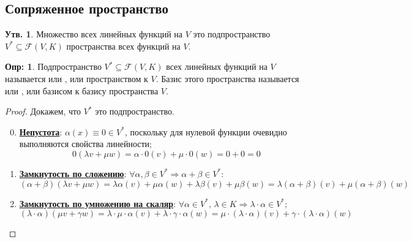 \documentclass[12pt]{article}
\newcommand{\MF}{\mathcal{F}}
\theoremstyle{definition}
\newtheorem{defn}{Опр:}
\newtheorem{prop}{Утв.}
\begin{document}
\subsection*{Сопряженное пространство}
\begin{prop}
	Множество всех линейных функций на $V$ это подпространство $V^* \subseteq \MF(V,K)$ пространства всех функций на $V$. 
\end{prop}
\begin{defn}
	Подпространство $V^* \subseteq \MF(V,K)$ всех линейных функций на $V$ называется  или , или  пространством к $V$. Базис этого пространства называется  или , или  базисом к базису пространства $V$.
\end{defn}
\begin{proof}
	Докажем, что $V^*$ это подпространство.
	\begin{enumerate}[label=\arabic*)]
		\setcounter{enumi}{-1}
		\item \textbf{\uline{Непустота}}: $\alpha(x) \equiv 0 \in V^{*}$, поскольку для нулевой функции очевидно выполняются свойства линейности;
		$$
			0(\lambda v + \mu w) = \alpha{\cdot}0(v) + \mu{\cdot}0(w) = 0 + 0 = 0
		$$
		\item \textbf{\uline{Замкнутость по сложению}}: $\forall \alpha, \beta \in V^* \Rightarrow \alpha + \beta \in V^*$:
		$$
			(\alpha + \beta)(\lambda v + \mu w) = \lambda \alpha(v) + \mu\alpha(w) + \lambda \beta(v) + \mu\beta(w) = \lambda(\alpha + \beta)(v) + \mu(\alpha + \beta)(w)
		$$
		\item \textbf{\uline{Замкнутость по умножению на скаляр}}: $\forall \alpha \in V^*, \, \lambda \in K \Rightarrow \lambda{\cdot}\alpha \in V^*$;
		$$
			(\lambda{\cdot}\alpha)(\mu v + \gamma w) = \lambda{\cdot}\mu{\cdot}\alpha(v) + \lambda{\cdot}\gamma{\cdot}\alpha(w) = \mu{\cdot}(\lambda{\cdot}\alpha)(v) + \gamma{\cdot}(\lambda{\cdot}\alpha)(w)
		$$
	\end{enumerate}
\end{proof}
\end{document}
